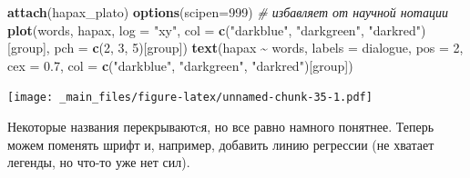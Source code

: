 \documentclass[
]{book}
\newenvironment{Shaded}{\begin{snugshade}}{\end{snugshade}}
\newcommand{\AttributeTok}[1]{\textcolor[rgb]{0.13,0.29,0.53}{#1}}
\newcommand{\CommentTok}[1]{\textcolor[rgb]{0.56,0.35,0.01}{\textit{#1}}}
\newcommand{\DecValTok}[1]{\textcolor[rgb]{0.00,0.00,0.81}{#1}}
\newcommand{\FloatTok}[1]{\textcolor[rgb]{0.00,0.00,0.81}{#1}}
\newcommand{\FunctionTok}[1]{\textcolor[rgb]{0.13,0.29,0.53}{\textbf{#1}}}
\newcommand{\NormalTok}[1]{#1}
\newcommand{\SpecialCharTok}[1]{\textcolor[rgb]{0.81,0.36,0.00}{\textbf{#1}}}
\newcommand{\StringTok}[1]{\textcolor[rgb]{0.31,0.60,0.02}{#1}}
\theoremstyle{definition}
\theoremstyle{definition}
\theoremstyle{definition}
\theoremstyle{definition}
\theoremstyle{remark}
\begin{document}
\begin{Shaded}
\begin{Highlighting}[]
\FunctionTok{attach}\NormalTok{(hapax\_plato)}
\FunctionTok{options}\NormalTok{(}\AttributeTok{scipen=}\DecValTok{999}\NormalTok{) }\CommentTok{\# избавляет от научной нотации}
\FunctionTok{plot}\NormalTok{(words, hapax, }\AttributeTok{log =} \StringTok{"xy"}\NormalTok{, }\AttributeTok{col =} \FunctionTok{c}\NormalTok{(}\StringTok{"darkblue"}\NormalTok{, }\StringTok{"darkgreen"}\NormalTok{, }\StringTok{"darkred"}\NormalTok{)[group], }
     \AttributeTok{pch =} \FunctionTok{c}\NormalTok{(}\DecValTok{2}\NormalTok{, }\DecValTok{3}\NormalTok{, }\DecValTok{5}\NormalTok{)[group])}
\FunctionTok{text}\NormalTok{(hapax }\SpecialCharTok{\textasciitilde{}}\NormalTok{ words, }\AttributeTok{labels =}\NormalTok{ dialogue, }
     \AttributeTok{pos =} \DecValTok{2}\NormalTok{, }\AttributeTok{cex =} \FloatTok{0.7}\NormalTok{, }\AttributeTok{col =} \FunctionTok{c}\NormalTok{(}\StringTok{"darkblue"}\NormalTok{, }\StringTok{"darkgreen"}\NormalTok{, }\StringTok{"darkred"}\NormalTok{)[group])}
\end{Highlighting}
\end{Shaded}

\texttt{[image: \_main\_files/figure-latex/unnamed-chunk-35-1.pdf]}

Некоторые названия перекрываютcя, но все равно намного понятнее. Теперь можем поменять шрифт и, например, добавить линию регрессии (не хватает легенды, но что-то уже нет сил).
\end{document}
